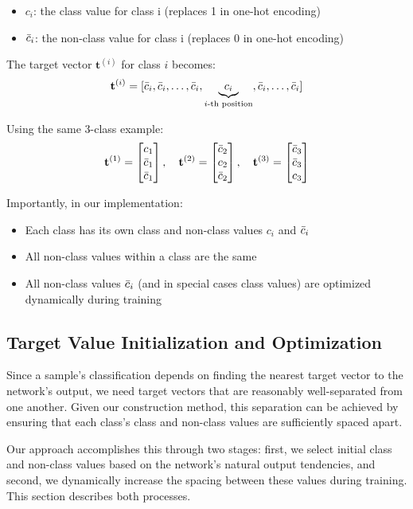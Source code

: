 \documentclass[12pt,fleqn,a4paper]{article}
\begin{document}
\begin{itemize}
\item $c_i$: the class value for class i (replaces 1 in one-hot encoding)
\item $\Bar{c}_i$: the non-class value for class i (replaces 0 in one-hot encoding)
\end{itemize}

The target vector $\mathbf{t}^{(i)}$ for class $i$ becomes:
$$\mathbf{t}^{(i)} = [\Bar{c}_i, \Bar{c}_i, \ldots, \Bar{c}_i, \underbrace{c_i}_{i\text{-th position}}, \Bar{c}_i, \ldots, \Bar{c}_i]$$

Using the same 3-class example:
$$\mathbf{t}^{(1)} = \begin{bmatrix} c_1 \\ \Bar{c}_1 \\ \Bar{c}_1 \end{bmatrix}, \quad 
\mathbf{t}^{(2)} = \begin{bmatrix} \Bar{c}_2 \\ c_2 \\ \Bar{c}_2 \end{bmatrix}, \quad 
\mathbf{t}^{(3)} = \begin{bmatrix} \Bar{c}_3 \\ \Bar{c}_3 \\ c_3 \end{bmatrix}$$

Importantly, in our implementation:
\begin{itemize}
\item Each class has its own class and non-class values $c_i$ and $\Bar{c}_i$
\item All non-class values within a class are the same
\item All non-class values $\Bar{c}_i$ (and in special cases class values) are optimized dynamically during training 
\end{itemize}

\subsection{Target Value Initialization and Optimization}
Since a sample's classification depends on finding the nearest target vector to the network's output, we need target vectors that are reasonably well-separated from one another. Given our construction method, this separation can be achieved by ensuring that each class's class and non-class values are sufficiently spaced apart.

Our approach accomplishes this through two stages: first, we select initial class and non-class values based on the network's natural output tendencies, and second, we dynamically increase the spacing between these values during training. This section describes both processes.
\end{document}
